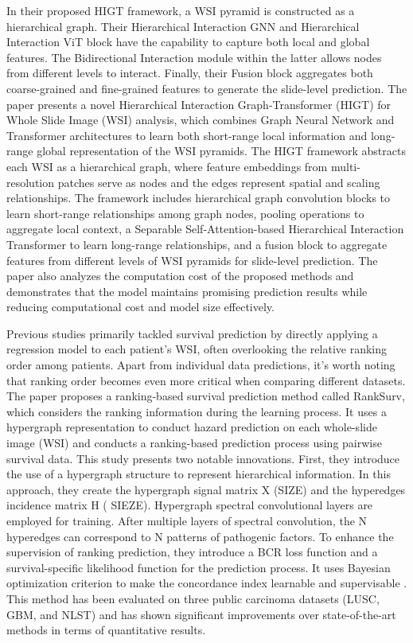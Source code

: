 \documentclass[journal,twoside,web]{ieeecolor}
\begin{document}
In their proposed HIGT framework\cite{guo2023higt}, a WSI pyramid is constructed as a hierarchical graph. Their Hierarchical Interaction GNN and Hierarchical Interaction ViT block have the capability to capture both local and global features. The Bidirectional Interaction module within the latter allows nodes from different levels to interact. Finally, their Fusion block aggregates both coarse-grained and fine-grained features to generate the slide-level prediction.
The paper presents a novel Hierarchical Interaction Graph-Transformer (HIGT) for Whole Slide Image (WSI) analysis, which combines Graph Neural Network and Transformer architectures to learn both short-range local information and long-range global representation of the WSI pyramids.
The HIGT framework abstracts each WSI as a hierarchical graph, where feature embeddings from multi-resolution patches serve as nodes and the edges represent spatial and scaling relationships.
The framework includes hierarchical graph convolution blocks to learn short-range relationships among graph nodes, pooling operations to aggregate local context, a Separable Self-Attention-based Hierarchical Interaction Transformer to learn long-range relationships, and a fusion block to aggregate features from different levels of WSI pyramids for slide-level prediction.
The paper also analyzes the computation cost of the proposed methods and demonstrates that the model maintains promising prediction results while reducing computational cost and model size effectively.

Previous studies primarily tackled survival prediction by directly applying a regression model to each patient's WSI, often overlooking the relative ranking order among patients. Apart from individual data predictions, it's worth noting that ranking order becomes even more critical when comparing different datasets. The paper proposes a ranking-based survival prediction method called RankSurv\cite{di2020ranking}, which considers the ranking information during the learning process. It uses a hypergraph representation to conduct hazard prediction on each whole-slide image (WSI) and conducts a ranking-based prediction process using pairwise survival data. This study presents two notable innovations. First, they introduce the use of a hypergraph structure to represent hierarchical information. In this approach, they create the hypergraph signal matrix X (SIZE) and the hyperedges incidence matrix H ( SIEZE). Hypergraph spectral convolutional layers are employed for training. After multiple layers of spectral convolution, the N hyperedges can correspond to N patterns of pathogenic factors. To enhance the supervision of ranking prediction, they introduce a BCR loss function and a survival-specific likelihood function for the prediction process. It uses Bayesian optimization criterion to make the concordance index learnable and supervisable . This method has been evaluated on three public carcinoma datasets (LUSC, GBM, and NLST) and has shown significant improvements over state-of-the-art methods in terms of quantitative results.
\end{document}
